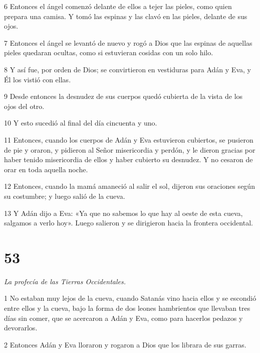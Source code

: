 \par 6 Entonces el ángel comenzó delante de ellos a tejer las pieles, como quien prepara una camisa. Y tomó las espinas y las clavó en las pieles, delante de sus ojos.

\par 7 Entonces el ángel se levantó de nuevo y rogó a Dios que las espinas de aquellas pieles quedaran ocultas, como si estuvieran cosidas con un solo hilo.

\par 8 Y así fue, por orden de Dios; se convirtieron en vestiduras para Adán y Eva, y Él los vistió con ellas.

\par 9 Desde entonces la desnudez de sus cuerpos quedó cubierta de la vista de los ojos del otro.

\par 10 Y esto sucedió al final del día cincuenta y uno.

\par 11 Entonces, cuando los cuerpos de Adán y Eva estuvieron cubiertos, se pusieron de pie y oraron, y pidieron al Señor misericordia y perdón, y le dieron gracias por haber tenido misericordia de ellos y haber cubierto su desnudez. Y no cesaron de orar en toda aquella noche.

\par 12 Entonces, cuando la mamá amaneció al salir el sol, dijeron sus oraciones según su costumbre; y luego salió de la cueva.

\par 13 Y Adán dijo a Eva: «Ya que no sabemos lo que hay al oeste de esta cueva, salgamos a verlo hoy». Luego salieron y se dirigieron hacia la frontera occidental.



\chapter{53}

\par \textit{La profecía de las Tierras Occidentales.}

\par 1 No estaban muy lejos de la cueva, cuando Satanás vino hacia ellos y se escondió entre ellos y la cueva, bajo la forma de dos leones hambrientos que llevaban tres días sin comer, que se acercaron a Adán y Eva, como para hacerlos pedazos y devorarlos.

\par 2 Entonces Adán y Eva lloraron y rogaron a Dios que los librara de sus garras.

